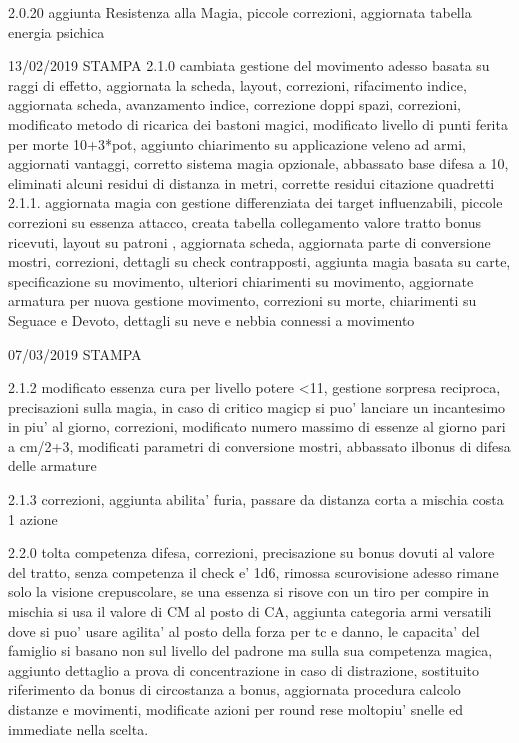 \documentclass[a4paper,11pt,twoside,openany]{book}
\begin{document}
{{2.0.20 aggiunta Resistenza alla Magia, piccole correzioni, aggiornata tabella energia psichica

13/02/2019 STAMPA
2.1.0 cambiata gestione del movimento adesso basata su raggi di effetto, aggiornata la scheda, layout, correzioni, rifacimento indice, aggiornata scheda, avanzamento indice, correzione doppi spazi, correzioni, modificato metodo di ricarica dei bastoni magici, modificato livello di punti ferita per morte 10+3*pot, aggiunto chiarimento su applicazione veleno ad armi, aggiornati vantaggi, corretto sistema magia opzionale, abbassato base difesa a 10, eliminati alcuni residui di distanza in metri, corrette residui citazione quadretti 2.1.1. aggiornata magia con gestione differenziata dei target influenzabili, piccole correzioni su essenza attacco, creata tabella collegamento valore tratto bonus ricevuti, layout su patroni , aggiornata scheda, aggiornata parte di conversione mostri, correzioni, dettagli su check contrapposti, aggiunta magia basata su carte, specificazione su movimento, ulteriori chiarimenti su movimento, aggiornate armatura per nuova gestione movimento, correzioni su morte, chiarimenti su Seguace e Devoto, dettagli su neve e nebbia connessi a movimento

07/03/2019 STAMPA

2.1.2 modificato essenza cura per livello potere \textless11, gestione sorpresa reciproca, precisazioni sulla magia, in caso di critico magicp si puo' lanciare un incantesimo in piu' al giorno, correzioni, modificato numero massimo di essenze al giorno pari a cm/2+3, modificati parametri di conversione mostri, abbassato ilbonus di difesa delle armature 

2.1.3 correzioni, aggiunta abilita' furia, passare da distanza corta a mischia costa 1 azione

2.2.0 tolta competenza difesa, correzioni, precisazione su bonus dovuti al valore del tratto, senza competenza il check e’ 1d6, rimossa scurovisione adesso rimane solo la visione crepuscolare, se una essenza si risove con un tiro per compire in mischia si usa il valore di CM al posto di CA, aggiunta categoria armi versatili dove si puo’ usare agilita’ al posto della forza per tc e danno, le capacita’ del famiglio si basano non sul livello del padrone ma sulla sua competenza magica, aggiunto dettaglio a prova di concentrazione in caso di distrazione, sostituito riferimento da bonus di circostanza a bonus, aggiornata procedura calcolo distanze e movimenti, modificate azioni per round rese moltopiu’ snelle ed immediate nella scelta.

}}
\end{document}
